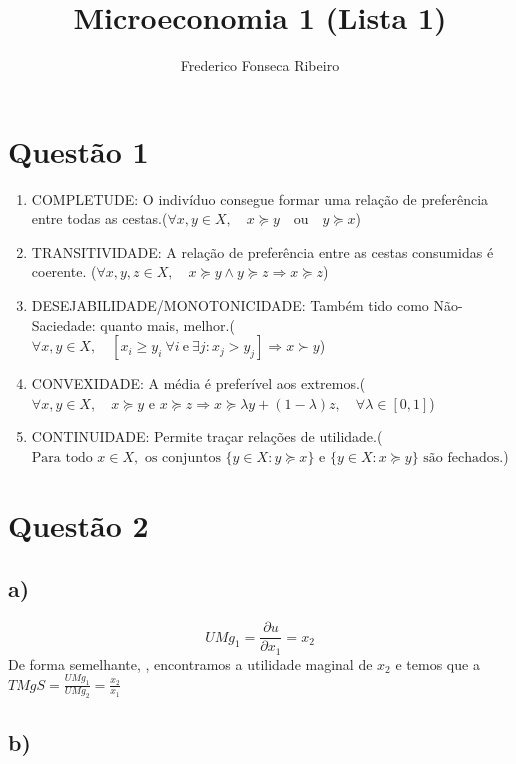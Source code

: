 \documentclass[
  letterpaper,
  DIV=11,
  numbers=noendperiod]{scrartcl}
\title{Microeconomia 1 (Lista 1)}
\author{Frederico Fonseca Ribeiro}
\date{}
\providecommand{\tightlist}{%
  \setlength{\itemsep}{0pt}\setlength{\parskip}{0pt}}\usepackage{longtable,booktabs,array}
\begin{document}
\maketitle


\section{Questão 1}\label{questuxe3o-1}

\begin{enumerate}
\def\labelenumi{\arabic{enumi}.}
\tightlist
\item
  COMPLETUDE: O indivíduo consegue formar uma relação de preferência
  entre todas as
  cestas.(\(\forall x, y \in X, \quad x \succeq y \quad \text{ou} \quad y \succeq x\))
\item
  TRANSITIVIDADE: A relação de preferência entre as cestas consumidas é
  coerente.
  (\(\forall x, y, z \in X, \quad x \succeq y \land y \succeq z \Rightarrow x \succeq z\))
\item
  DESEJABILIDADE/MONOTONICIDADE: Também tido como Não-Saciedade: quanto
  mais,
  melhor.(\(\forall x, y \in X, \quad \left[ x_i \geq y_i \ \forall i \ \text{e} \ \exists j: x_j > y_j \right] \Rightarrow x \succ y\))
\item
  CONVEXIDADE: A média é preferível aos
  extremos.(\(\forall x, y \in X, \quad x \succeq y \text{ e } x \succeq z \Rightarrow x \succeq \lambda y + (1 - \lambda)z, \quad \forall \lambda \in [0,1]\))
\item
  CONTINUIDADE: Permite traçar relações de
  utilidade.(\(\text{Para todo } x \in X, \text{ os conjuntos } \{ y \in X : y \succeq x \} \text{ e } \{ y \in X : x \succeq y \} \text{ são fechados.}\))
\end{enumerate}

\section{Questão 2}\label{questuxe3o-2}

\subsection{a)}\label{a}

\[
UMg_1 = \frac{\partial u}{\partial x_1} = x_2
\] De forma semelhante, , encontramos a utilidade maginal de \(x_2\) e
temos que a \(TMgS = \frac{UMg_1}{UMg_2} = \frac{x_2}{x_1}\)

\subsection{b)}\label{b}
\end{document}
